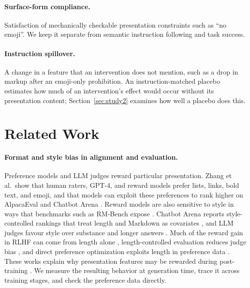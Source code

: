 \documentclass[acmsmall,screen,review,anonymous]{acmart}
\begin{document}
\paragraph{Surface-form compliance.} Satisfaction of mechanically checkable presentation constraints such as ``no emoji''. We keep it separate from semantic instruction following and task success.

\paragraph{Instruction spillover.} A change in a feature that an intervention does not mention, such as a drop in markup after an emoji-only prohibition. An instruction-matched placebo estimates how much of an intervention's effect would occur without its presentation content; Section~\ref{sec:study2} examines how well a placebo does this.

\section{Related Work}
\label{sec:related}

\paragraph{Format and style bias in alignment and evaluation.} Preference models and LLM judges reward particular presentation. Zhang et al.\ show that human raters, GPT-4, and reward models prefer lists, links, bold text, and emoji, and that models can exploit these preferences to rank higher on AlpacaEval and Chatbot Arena \cite{zhang2025lists}. Reward models are also sensitive to style in ways that benchmarks such as RM-Bench expose \cite{liu2025rmbench}. Chatbot Arena \cite{chiang2024chatbot} reports style-controlled rankings that treat length and Markdown as covariates \cite{li2024style}, and LLM judges favour style over substance \cite{feuer2025style} and longer answers \cite{zheng2023judging,saito2023verbosity}. Much of the reward gain in RLHF can come from length alone \cite{singhal2024length}, length-controlled evaluation reduces judge bias \cite{dubois2024length}, and direct preference optimization exploits length in preference data \cite{park2024disentangling}. These works explain why presentation features may be rewarded during post-training \cite{ouyang2022training,rafailov2023direct}. We measure the resulting behavior at generation time, trace it across training stages, and check the preference data directly.
\end{document}
